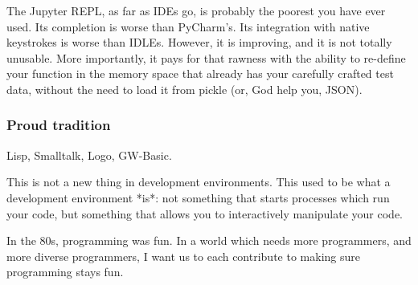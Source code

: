 The Jupyter REPL,
as far as IDEs go,
is probably the poorest you have ever used.
Its completion is worse than PyCharm's.
Its integration with native keystrokes is
worse than IDLEs.
However,
it is improving,
and it is not totally unusable.
More importantly,
it pays for that rawness with the ability
to re-define your function in the memory space
that already has your carefully crafted
test data,
without the need to load it from pickle
(or,
God help you,
JSON).

\begin{frame}
\frametitle{Proud tradition}

Lisp, Smalltalk, Logo, GW-Basic.

\end{frame}

This is not a new thing in development environments.
This used to be what a development environment *is*:
not something that starts processes which run your code,
but something that allows you to interactively manipulate your code.

In the 80s, programming was fun.
In a world which needs more programmers,
and more diverse programmers,
I want us to each contribute to making sure programming stays fun.


